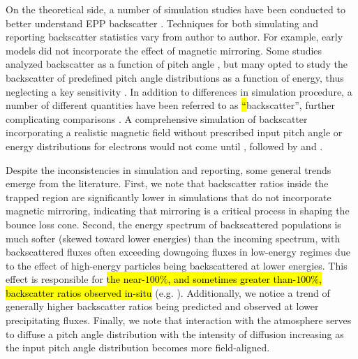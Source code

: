 \documentclass[draft]{agujournal2019}
\begin{document}
On the theoretical side, a number of simulation studies have been conducted to better understand EPP backscatter \cite{maeda1965, cummings1966, walt1968, banks1970, banks1974, berger1974, mantas1976, davidson1977, lejeune1979, cotts2011, marshall2018, berland2023}. Techniques for both simulating and reporting backscatter statistics vary from author to author. For example, early models \cite{maeda1965, berger1974} did not incorporate the effect of magnetic mirroring. Some studies analyzed backscatter as a function of pitch angle \cite{berger1974, cotts2011, marshall2018, berland2023}, but many opted to study the backscatter of predefined pitch angle distributions as a function of energy, thus neglecting a key sensitivity \cite{maeda1965, cummings1966, walt1968, banks1970, banks1974, mantas1976, solomon2001}. In addition to differences in simulation procedure, a number of different quantities have been referred to as \hl{``}backscatter'', further complicating comparisons \cite{mantas1976}. A comprehensive simulation of backscatter incorporating a realistic magnetic field without prescribed input pitch angle or energy distributions for electrons would not come until , followed by  and .

Despite the inconsistencies in simulation and reporting, some general trends emerge from the literature. First, we note that backscatter ratios inside the trapped region are significantly lower in simulations that do not incorporate magnetic mirroring, indicating that mirroring is a critical process in shaping the bounce loss cone. Second, the energy spectrum of backscattered populations is much softer (skewed toward lower energies) than the incoming spectrum, with backscattered fluxes often exceeding downgoing fluxes in low-energy regimes due to the effect of high-energy particles being backscattered at lower energies. This effect is responsible for \hl{the near-$100\%$, and sometimes greater than-$100\%$, backscatter ratios observed in-situ} (e.g. ). Additionally, we notice a trend of generally higher backscatter ratios being predicted and observed at lower precipitating fluxes. Finally, we note that interaction with the atmosphere serves to diffuse a pitch angle distribution with the intensity of diffusion increasing as the input pitch angle distribution becomes more field-aligned.
\end{document}
